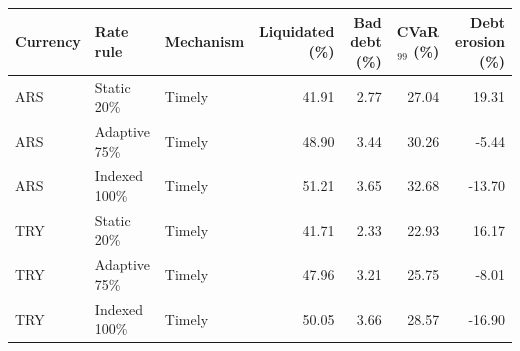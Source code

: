 \begin{tabular}{lllrrrr}
\toprule
Currency & Rate rule & Mechanism & Liquidated (\%) & Bad debt (\%) & CVaR$_{99}$ (\%) & Debt erosion (\%) \\
\midrule
ARS & Static 20\% & Timely & 41.91 & 2.77 & 27.04 & 19.31 \\
ARS & Adaptive 75\% & Timely & 48.90 & 3.44 & 30.26 & -5.44 \\
ARS & Indexed 100\% & Timely & 51.21 & 3.65 & 32.68 & -13.70 \\
TRY & Static 20\% & Timely & 41.71 & 2.33 & 22.93 & 16.17 \\
TRY & Adaptive 75\% & Timely & 47.96 & 3.21 & 25.75 & -8.01 \\
TRY & Indexed 100\% & Timely & 50.05 & 3.66 & 28.57 & -16.90 \\
\bottomrule
\end{tabular}
